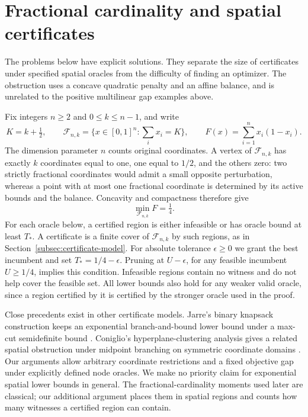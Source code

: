 \section{Fractional cardinality and spatial certificates}
\label{sec:cardinality-spatial}
The problems below have explicit solutions. They separate the size of
certificates under specified spatial oracles from the difficulty of
finding an optimizer. The obstruction uses a concave quadratic penalty and
an affine balance, and is unrelated to the positive multilinear gap
examples above.

Fix integers $n\ge2$ and $0\le k\le n-1$, and write
\begin{equation}\label{eq:cardinality-problem}
 K=k+\tfrac12,\qquad
 \mathcal F_{n,k}=\{x\in[0,1]^n:\textstyle\sum_i x_i=K\},\qquad
 F(x)=\sum_{i=1}^n x_i(1-x_i).
\end{equation}
The dimension parameter $n$ counts original coordinates. A vertex of
$\mathcal F_{n,k}$ has exactly $k$ coordinates equal to one, one equal to
$1/2$, and the others zero: two strictly fractional coordinates would admit
a small opposite perturbation, whereas a point with at most one fractional
coordinate is determined by its active bounds and the balance. Concavity
and compactness therefore give
\begin{equation}\label{eq:cardinality-optimum}
 \min_{\mathcal F_{n,k}}F=\tfrac14.
\end{equation}
For each oracle below, a certified region is either infeasible or has
oracle bound at least $T_*$. A certificate is a finite cover of
$\mathcal F_{n,k}$ by such regions, as in
Section~\ref{subsec:certificate-model}. For absolute tolerance
$\epsilon\ge0$ we grant the best incumbent and set
$T_*=1/4-\epsilon$. Pruning at $U-\epsilon$, for any feasible incumbent
$U\ge1/4$, implies this condition. Infeasible regions contain no witness
and do not help cover the feasible set. All lower bounds also hold for any
weaker valid oracle, since a region certified by it is certified by the
stronger oracle used in the proof.

Close precedents exist in other certificate models. Jarre's binary
knapsack construction keeps an exponential branch-and-bound lower bound
under a max-cut semidefinite bound \citep[Sections 2--3]{Jarre2018}.
Coniglio's hyperplane-clustering analysis gives a related spatial
obstruction under midpoint branching on symmetric coordinate domains
\citep[Assumption 1, Propositions 2--4, Appendix C in the review version]{Coniglio2026}.
Our arguments allow arbitrary coordinate restrictions and a fixed
objective gap under explicitly defined node oracles. We make no
priority claim for exponential spatial lower bounds in general. The
fractional-cardinality moments used later are classical; our additional
argument places them in spatial regions and counts how many witnesses a
certified region can contain.

